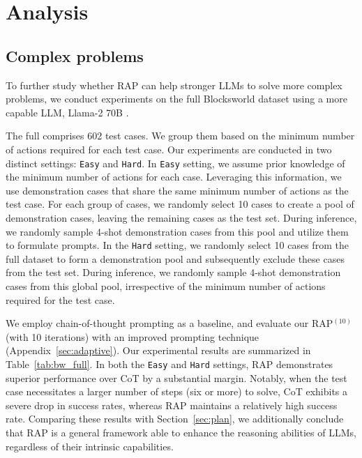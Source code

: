 \section{Analysis}
\subsection{Complex problems}


To further study whether RAP can help stronger LLMs to solve more complex problems, we conduct experiments on the full Blocksworld \cite{valmeekam2023planning} dataset using a more capable LLM, Llama-2 70B \cite{touvron2023llama2}. 

The full \blocksworld \cite{valmeekam2023planning} comprises 602 test cases. We group them based on the minimum number of actions required for each test case. %
Our experiments are conducted in two distinct settings: \texttt{Easy} and \texttt{Hard}. In \texttt{Easy} setting, we assume prior knowledge of the minimum number of actions for each case. Leveraging this information, we use demonstration cases that share the same minimum number of actions as the test case.
For each group of cases, we randomly select 10 cases to create a pool of demonstration cases, leaving the remaining cases as the test set. During inference, we randomly sample 4-shot demonstration cases from this pool and utilize them to formulate prompts.
In the \texttt{Hard} setting, we randomly select 10 cases from the full dataset to form a demonstration pool and subsequently exclude these cases from the test set.
During inference, we randomly sample 4-shot demonstration cases from this global pool, irrespective of the minimum number of actions required for the test case.

We employ chain-of-thought prompting \cite{wei2022chain} as a baseline, and evaluate our RAP$^{(10)}$ (with 10 iterations) with an improved prompting technique (Appendix~\ref{sec:adaptive}). Our experimental results are summarized in Table~\ref{tab:bw_full}. In both the \texttt{Easy} and \texttt{Hard} settings, RAP demonstrates superior performance over CoT by a substantial margin. Notably, when the test case necessitates a larger number of steps (six or more) to solve, CoT exhibits a severe drop in success rates, whereas RAP maintains a relatively high success rate. Comparing these results with Section~\ref{sec:plan}, we additionally conclude that RAP is a general framework able to enhance the reasoning abilities of LLMs, regardless of their intrinsic capabilities.

